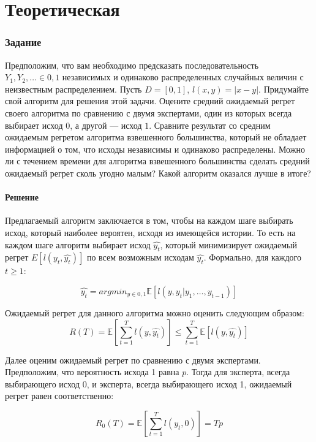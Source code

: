 \documentclass[a4paper,14pt]{extarticle}
\begin{document}
\newpage

\part{Теоретическая}
\section{Задание }

Предположим, что вам необходимо предсказать последовательность $Y_1, Y_2, \ldots \in {0, 1}$ независимых и одинаково распределенных случайных величин с неизвестным распределением. Пусть $D = [0, 1]$, $l(x, y) = |x - y|$. Придумайте свой алгоритм для решения этой задачи. Оцените средний ожидаемый регрет своего алгоритма по сравнению с двумя экспертами, один из которых всегда выбирает исход $0$, а другой — исход $1$. Сравните результат со средним ожидаемым регретом алгоритма взвешенного большинства, который не обладает информацией о том, что исходы независимы и одинаково распределены. Можно ли с течением времени для алгоритма взвешенного большинства сделать средний ожидаемый регрет сколь угодно малым? Какой алгоритм оказался лучше в итоге?

\subsection{Решение}

Предлагаемый алгоритм заключается в том, чтобы на каждом шаге выбирать исход, который наиболее вероятен, исходя из имеющейся истории. То есть на каждом шаге алгоритм выбирает исход $\hat{y_t}$, который минимизирует ожидаемый регрет $E[l(y_t,\hat{y_t})]$ по всем возможным исходам $\hat{y_t}$. Формально, для каждого $t\geq 1$:

$$\hat{y_t} = argmin_{y \in {0, 1}}\mathbb{E}\left[l(y, y_t|y_1, \ldots, y_{t-1})\right]$$

Ожидаемый регрет для данного алгоритма можно оценить следующим образом:
$$R(T) = \mathbb{E}\left[\sum_{t=1}^{T} l\left(y, \hat{y_t}\right)\right] \le \sum_{t=1}^{T}\mathbb{E}\left[l\left(y, \hat{y_t}\right)\right]$$

Далее оценим ожидаемый регрет по сравнению с двумя экспертами. Предположим, что вероятность исхода 1 равна $p$. Тогда для эксперта, всегда выбирающего исход 0, и эксперта, всегда выбирающего исход 1, ожидаемый регрет равен соответственно:

$$R_0(T) = \mathbb{E}\left[\sum_{t=1}^{T} l\left(y_t, 0\right)\right] = Tp$$
\end{document}
